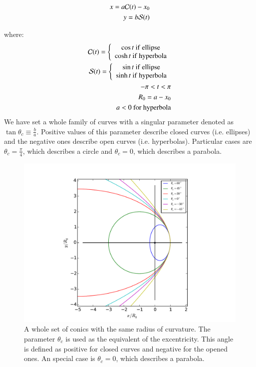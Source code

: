 \begin{align}
x = a\mathcal{C}(t)-x_0 \\ 
y = b\mathcal{S}(t)
\end{align}

where:
\begin{align}
\mathcal{C}(t) = \left\lbrace \begin{array}{c}
\cos t ~\mathrm{if~ellipse} \\
\cosh t ~\mathrm{if~hyperbola}
\end{array}\right.\\
\mathcal{S}(t) = \left\lbrace \begin{array}{c}
\sin t ~\mathrm{if~ellipse} \\
\sinh t ~\mathrm{if~hyperbola}
\end{array}\right. \\
-\pi < t < \pi \\
R_0 = a - x_0 \\
a<0 ~ \mathrm{for~hyperbola}
\end{align}
We have set a whole family of curves with a singular parameter denoted as $\tan\theta_c \equiv \frac{b}{a}$. Positive values of this parameter describe closed curves
(i.e. ellipses) and the negative ones describe open curves (i.e. hyperbolas). Particular cases are $\theta_c =\frac{\pi}{4}$, which describes a circle and $\theta_c=0$, which describes
a parabola.
\begin{figure}
\includegraphics[width=\linewidth]{conic1}
\caption{A whole set of conics with the same radius of curvature. The parameter $\theta_c$ is used as the equivalent of the excentricity. This angle is defined as positive for closed curves
and negative for the opened ones. An special case is $\theta_c=0$, which describes a parabola.}
\label{fig:conics-family}
\end{figure}
